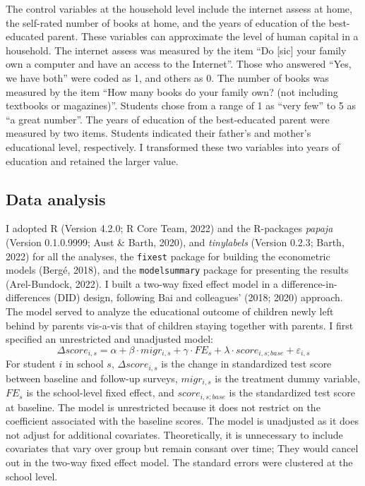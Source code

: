 \documentclass[
  man]{apa7}
\begin{document}
The control variables at the household level include the internet assess at home, the self-rated number of books at home, and the years of education of the best-educated parent. These variables can approximate the level of human capital in a household. The internet assess was measured by the item ``Do {[}sic{]} your family own a computer and have an access to the Internet''. Those who answered ``Yes, we have both'' were coded as 1, and others as 0. The number of books was measured by the item ``How many books do your family own? (not including textbooks or magazines)''. Students chose from a range of 1 as ``very few'' to 5 as ``a great number''. The years of education of the best-educated parent were measured by two items. Students indicated their father's and mother's educational level, respectively. I transformed these two variables into years of education and retained the larger value.

\hypertarget{data-analysis}{%
\subsection{Data analysis}\label{data-analysis}}

I adopted R (Version 4.2.0; R Core Team, 2022) and the R-packages \emph{papaja} (Version 0.1.0.9999; Aust \& Barth, 2020), and \emph{tinylabels} (Version 0.2.3; Barth, 2022) for all the analyses, the \texttt{fixest} package for building the econometric models (Bergé, 2018), and the \texttt{modelsummary} package for presenting the results (Arel-Bundock, 2022). I built a two-way fixed effect model in a difference-in-differences (DID) design, following Bai and colleagues' (2018; 2020) approach. The model served to analyze the educational outcome of children newly left behind by parents vis-a-vis that of children staying together with parents. I first specified an unrestricted and unadjusted model: \[\Delta score_{i,s} = \alpha + \beta \cdot migr_{i,s} + \gamma \cdot FE_{s} + \lambda \cdot score_{i,s;base} + \varepsilon_{i,s}\]For student \(i\) in school \(s\), \(\Delta score_{i,s}\) is the change in standardized test score between baseline and follow-up surveys, \(migr_{i,s}\) is the treatment dummy variable, \(FE_{s}\) is the school-level fixed effect, and \(score_{i,s;base}\) is the standardized test score at baseline. The model is unrestricted because it does not restrict on the coefficient associated with the baseline scores. The model is unadjusted as it does not adjust for additional covariates. Theoretically, it is unnecessary to include covariates that vary over group but remain consant over time; They would cancel out in the two-way fixed effect model. The standard errors were clustered at the school level.
\end{document}

